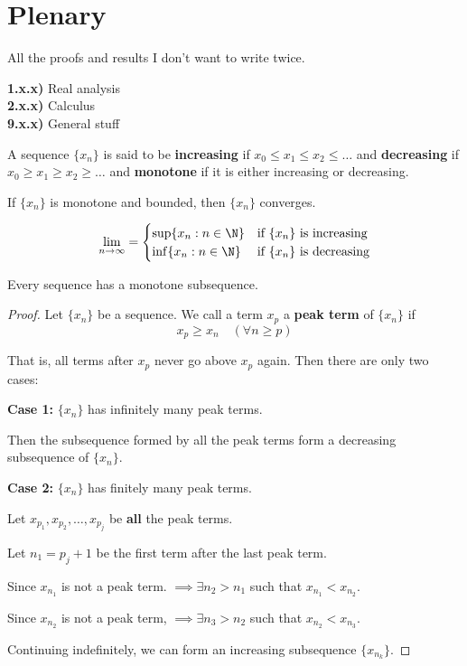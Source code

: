
\section{Plenary}\label{80eeafc}

All the proofs and results I don't want to write twice.

\textbf{1.x.x)} Real analysis \\
\textbf{2.x.x)} Calculus \\
\textbf{9.x.x)} General stuff \\

\label{d5142a8}

A sequence $\{x_n\}$ is said to be \textbf{increasing} if $x_0\leq
	x_1\leq x_2\leq\ldots$ and \textbf{decreasing} if $x_0\geq x_1\geq
	x_2\geq\ldots$ and \textbf{monotone} if it is either increasing or
decreasing.

\label{ca25eb7}

If $\{x_n\}$ is monotone and bounded, then $\{x_n\}$ converges.

$$
	\lim_{n\to\infty}=\begin{cases}
		\sup\{x_n:n\in\N\} & \text{if $\{x_n\}$ is increasing} \\
		\inf\{x_n:n\in\N\} & \text{if $\{x_n\}$ is decreasing}
	\end{cases}
$$

\label{dddb70e}

Every sequence has a monotone subsequence.

\begin{proof}
	\def\xn{\{x_n\}}

	Let $\xn$ be a sequence. We call a term $x_p$ a \textbf{peak term}
	of $\xn$ if
	$$x_p\geq x_n\quad(\forall n\geq p)$$

	That is, all terms after $x_p$ never go above $x_p$ again. Then
	there are only two cases:

	\textbf{Case 1:} $\xn$ has infinitely many peak terms.

	Then the subsequence formed by all the peak terms form a decreasing
	subsequence of $\xn$.

	\textbf{Case 2:} $\xn$ has finitely many peak terms.

	Let $x_{p_1},x_{p_2},\ldots,x_{p_j}$ be \textbf{all} the peak terms.

	Let $n_1=p_j+1$ be the first term after the last peak term.

	Since $x_{n_1}$ is not a peak term. $\implies\exists n_2>n_1$ such
	that $x_{n_1}<x_{n_2}$.

	Since $x_{n_2}$ is not a peak term, $\implies\exists n_3>n_2$ such
	that $x_{n_2}<x_{n_3}$.

	Continuing indefinitely, we can form an increasing subsequence
	$\{x_{n_k}\}$.
\end{proof}

